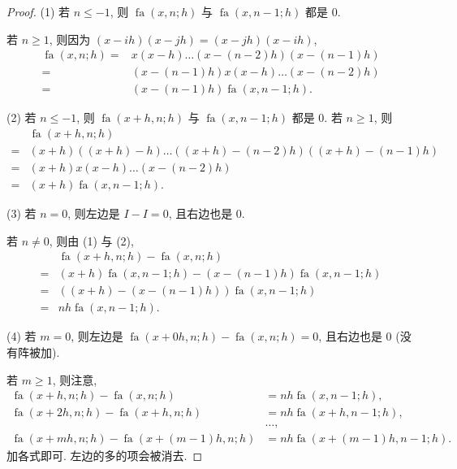\documentclass[../libro.tex]{subfiles}
\begin{document}
\begin{proof}
    (1)
    若 \(n \leq -1\), 则
    \(\operatorname{fa} {(x, n; h)}\)
    与 \(\operatorname{fa} {(x, n-1; h)}\) 都是 \(0\).

    若 \(n \geq 1\), 则因为
    \((x - i h) (x - j h) = (x - j h) (x - i h)\),
    \begin{align*}
        \operatorname{fa} {(x, n; h)}
        = {} &
        x (x - h) \dots (x - (n-2) h) (x - (n-1) h)
        \\
        = {} &
        (x - (n-1) h) x (x - h) \dots (x - (n-2) h)
        \\
        = {} &
        (x - (n-1) h) \operatorname{fa} {(x, n-1; h)}.
    \end{align*}

    (2)
    若 \(n \leq -1\), 则
    \(\operatorname{fa} {(x+h, n; h)}\)
    与 \(\operatorname{fa} {(x, n-1; h)}\) 都是 \(0\).
    若 \(n \geq 1\), 则
    \begin{align*}
        &
        \operatorname{fa} {(x+h, n; h)}
        \\
        = {} &
        (x+h) ((x+h) - h) \dots ((x+h) - (n-2) h) ((x+h) - (n-1) h)
        \\
        = {} &
        (x + h) x (x - h) \dots (x - (n-2) h)
        \\
        = {} &
        (x + h) \operatorname{fa} {(x, n-1; h)}.
    \end{align*}

    (3)
    若 \(n = 0\), 则左边是 \(I - I = 0\),
    且右边也是 \(0\).

    若 \(n \neq 0\), 则由 (1) 与 (2),
    \begin{align*}
        &
        \operatorname{fa} {(x + h, n; h)}
        - \operatorname{fa} {(x, n; h)}
        \\
        = {} &
        (x + h) \operatorname{fa} {(x, n-1; h)}
        - (x - (n-1)h) \operatorname{fa} {(x, n-1; h)}
        \\
        = {} &
        ((x + h) - (x - (n-1)h))
        \operatorname{fa} {(x, n-1; h)}
        \\
        = {} &
        n h \operatorname{fa} {(x, n-1; h)}.
    \end{align*}

    (4)
    若 \(m = 0\),
    则左边是
    \(\operatorname{fa} {(x + 0 h, n; h)}
    - \operatorname{fa} {(x, n; h)} = 0\),
    且右边也是 \(0\)
    (没有阵被加).

    若 \(m \geq 1\), 则注意,
    \begin{align*}
        \operatorname{fa} {(x + h, n; h)}
        - \operatorname{fa} {(x, n; h)}
        & = n h \operatorname{fa} {(x, n-1; h)},
        \\
        \operatorname{fa} {(x + 2h, n; h)}
        - \operatorname{fa} {(x + h, n; h)}
        & = n h \operatorname{fa} {(x + h, n-1; h)},
        \\
        & \dots,
        \\
        \operatorname{fa} {(x + mh, n; h)}
        - \operatorname{fa} {(x + (m-1)h, n; h)}
        & = n h \operatorname{fa} {(x + (m-1)h, n-1; h)}.
    \end{align*}
    加各式即可.
    左边的多的项会被消去.


\end{proof}
\end{document}
